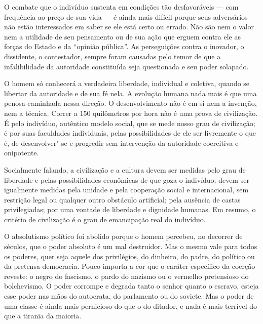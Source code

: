 O combate que o indivíduo sustenta em condições tão desfavoráveis --- com
frequência ao preço de sua vida --- é ainda mais difícil porque seus
adversários não estão interessados em saber se ele está certo ou
errado. Não são nem o valor nem a utilidade de seu pensamento ou de
sua ação que erguem contra ele as forças do Estado e da “opinião
pública”. As perseguições contra o inovador, o dissidente, o
contestador, sempre foram causadas pelo temor de que a infalibilidade
da autoridade constituída seja questionada e seu poder solapado.

O homem só conhecerá a verdadeira liberdade, individual e coletiva,
quando se libertar da autoridade e de sua fé nela. A evolução humana
nada mais é que uma penosa caminhada nessa direção. O desenvolvimento
não é em si nem a invenção, nem a técnica. Correr a 150 quilômetros por hora não
é uma prova de civilização. É pelo indivíduo, autêntico modelo social,
que se mede nosso grau de civilização; é por suas faculdades individuais,
pelas possibilidades de ele ser livremente o que é, de desenvolver"-se
e progredir sem intervenção da autoridade coercitiva e onipotente.

Socialmente falando, a civilização e a cultura devem ser medidas pelo
grau de liberdade e pelas possibilidades econômicas de que goza o
indivíduo; devem ser igualmente medidas pela unidade e pela cooperação
social e internacional, sem restrição legal ou qualquer outro obstáculo
artificial; pela ausência de castas privilegiadas; por uma vontade de
liberdade e dignidade humanas. Em resumo, o critério de civilização é o
grau de emancipação real do indivíduo.

O absolutismo político foi abolido porque o homem percebeu, no decorrer
de séculos, que o poder absoluto é um mal destruidor. Mas o mesmo vale
para todos os poderes, quer seja aquele dos privilégios, do dinheiro,
do padre, do político ou da pretensa democracia. Pouco importa a cor
que o caráter específico da coerção reveste: o negro do fascismo, o
pardo do nazismo ou o vermelho pretensioso do bolchevismo. O poder
corrompe e degrada tanto o senhor quanto o escravo, esteja esse
poder nas mãos do autocrata, do parlamento ou do soviete. Mas o poder
de uma classe é ainda mais pernicioso do que o do ditador, e nada é
mais terrível do que a tirania da maioria.

